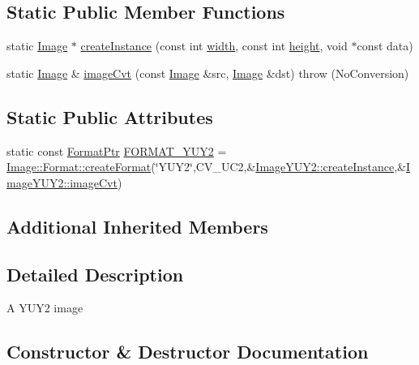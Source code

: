 \subsection*{Static Public Member Functions}
\begin{DoxyCompactItemize}
\item 
static \hyperlink{classcolorspaces_1_1_image}{Image} $\ast$ \hyperlink{classcolorspaces_1_1_image_y_u_y2_aa9b60cfc9b469d0e20a3190fa5d91d2e}{create\+Instance} (const int \hyperlink{classcolorspaces_1_1_image_ab80af7d4797110c23ed575b329ec7c4f}{width}, const int \hyperlink{classcolorspaces_1_1_image_a99a05ebd37f61215b2c3042ecaefdbfc}{height}, void $\ast$const data)
\item 
static \hyperlink{classcolorspaces_1_1_image}{Image} \& \hyperlink{classcolorspaces_1_1_image_y_u_y2_aaa26a6af0f8e2f36d35d65a5dcb0a25a}{image\+Cvt} (const \hyperlink{classcolorspaces_1_1_image}{Image} \&src, \hyperlink{classcolorspaces_1_1_image}{Image} \&dst)  throw (\+No\+Conversion)
\end{DoxyCompactItemize}
\subsection*{Static Public Attributes}
\begin{DoxyCompactItemize}
\item 
static const \hyperlink{classcolorspaces_1_1_image_ab3978cc7acc2b5e855f8c715f09667d1}{Format\+Ptr} \hyperlink{classcolorspaces_1_1_image_y_u_y2_ad78f841cffc31b95f8069cb789e9f0e4}{F\+O\+R\+M\+A\+T\+\_\+\+Y\+U\+Y2} = \hyperlink{classcolorspaces_1_1_image_1_1_format_ae79208f237b72cf596331ebcec2ff58b}{Image\+::\+Format\+::create\+Format}(\char`\"{}Y\+U\+Y2\char`\"{},C\+V\+\_\+U\+C2,\&\hyperlink{classcolorspaces_1_1_image_y_u_y2_aa9b60cfc9b469d0e20a3190fa5d91d2e}{Image\+Y\+U\+Y2\+::create\+Instance},\&\hyperlink{classcolorspaces_1_1_image_y_u_y2_aaa26a6af0f8e2f36d35d65a5dcb0a25a}{Image\+Y\+U\+Y2\+::image\+Cvt})
\end{DoxyCompactItemize}
\subsection*{Additional Inherited Members}


\subsection{Detailed Description}
A Y\+U\+Y2 image 

\subsection{Constructor \& Destructor Documentation}
\mbox{\label{classcolorspaces_1_1_image_y_u_y2_ae77eecb2d0ea17a1ccaddac374e5d61b}} 
